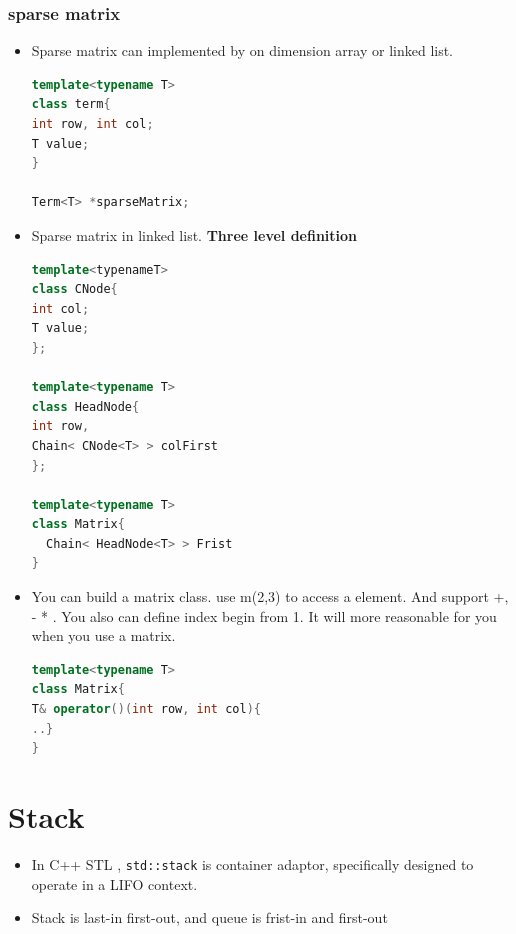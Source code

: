 \documentclass[a4paper,11pt,twoside]{book}
\begin{document}
\subsubsection{sparse matrix}
\begin{itemize}
\item Sparse matrix can implemented by on dimension array or  linked list. 
\begin{lstlisting}[frame=single, language=c++]
template<typename T>
class term{
int row, int col;
T value;
}

Term<T> *sparseMatrix;
\end{lstlisting}

\item Sparse matrix in linked list.  \textbf{Three level definition}
\begin{lstlisting}[frame=single, language=c++]
template<typenameT>
class CNode{
int col;
T value;
};

template<typename T>
class HeadNode{
int row, 
Chain< CNode<T> > colFirst
};
  
template<typename T>
class Matrix{
  Chain< HeadNode<T> > Frist
} 
\end{lstlisting}


\item You can build a matrix class. use m(2,3) to access a element. And support +, - * . You also can define index begin from 1. It will more reasonable for you when you use a matrix. 
\begin{lstlisting}[frame=single, language=c++]
template<typename T>
class Matrix{
T& operator()(int row, int col){
..}
}
\end{lstlisting} 

\end{itemize}

 
\section{Stack}
\begin{itemize}
\item In C++ STL , \texttt{std::stack} is container adaptor, specifically designed to operate in a LIFO context. 

\item Stack is last-in first-out, and queue is frist-in and first-out



\end{itemize}
\end{document}
